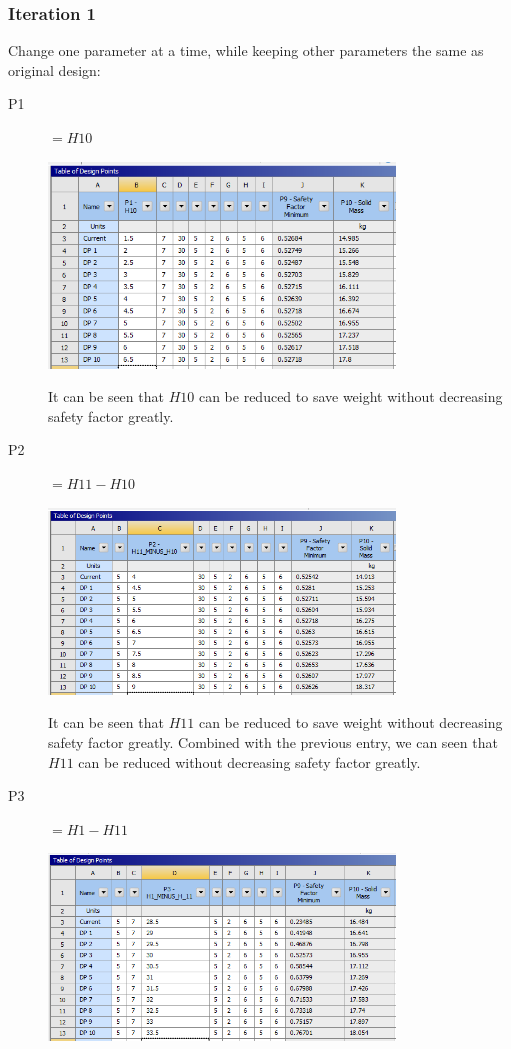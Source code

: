 \documentclass[a4paper,14pt]{extarticle}
\begin{document}
\subsubsection{Iteration 1}
Change one parameter at a time, while keeping other parameters the same as original design:
\begin{description}
\item[P1] $=H10$

\includegraphics[width=0.75\textwidth]{singleParam/P1.PNG}

It can be seen that $H10$ can be reduced to save weight without decreasing safety factor greatly.
\item[P2] $=H11-H10$

\includegraphics[width=0.75\textwidth]{singleParam/P2.PNG}

It can be seen that $H11$ can be reduced to save weight without decreasing safety factor greatly. Combined with the previous entry, we can seen that $H11$ can be reduced without decreasing safety factor greatly.
\item[P3] $=H1-H11$

\includegraphics[width=0.75\textwidth]{singleParam/P3.PNG}


\end{description}
\end{document}
